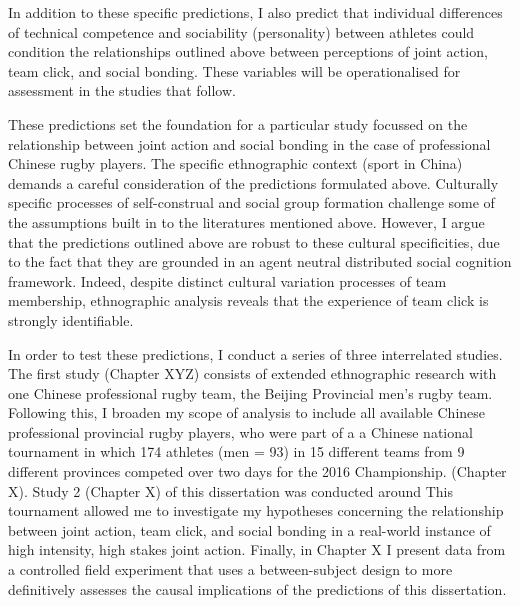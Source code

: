  In addition to these specific predictions, I also predict that individual differences of technical competence and sociability (personality) between athletes could condition the relationships outlined above between perceptions of joint action, team click, and social bonding.  These variables will be operationalised for assessment in the studies that follow.


These predictions set the foundation for a particular study focussed on the relationship between joint action and social bonding in the case of professional Chinese rugby players. The specific ethnographic context (sport in China) demands a careful consideration of the predictions formulated above.  Culturally specific processes of self-construal and social group formation challenge some of the assumptions built in to the literatures mentioned above.  However, I argue that the predictions outlined above are robust to these cultural specificities, due to the fact that they are grounded in an agent neutral distributed social cognition framework. Indeed, despite distinct cultural variation processes of team membership, ethnographic analysis reveals that the experience of team click is strongly identifiable.

In order to test these predictions, I conduct a series of three interrelated studies.  The first study (Chapter XYZ) consists of extended ethnographic research with one Chinese professional rugby team, the Beijing Provincial men's rugby team.  Following this, I broaden my scope of analysis to include all available Chinese professional provincial rugby players, who were part of a a Chinese national tournament in which 174 athletes (men = 93) in 15 different teams from 9 different provinces competed over two days for the 2016 Championship. (Chapter X).  Study 2  (Chapter X) of this dissertation was conducted around This tournament allowed me to investigate my hypotheses concerning the relationship between joint action, team click, and social bonding in a real-world instance of high intensity, high stakes joint action.  Finally, in Chapter X I present data from a controlled field experiment that uses a between-subject design to more definitively assesses the causal implications of the predictions of this dissertation.
